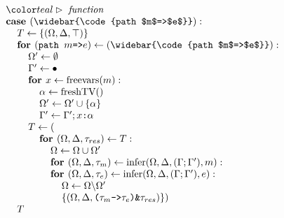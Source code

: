 \documentclass[acmsmall]{acmart}
\begin{document}
\begin{figure*}[h]
\[\begin{array}[t]{@{} l}
    \\

    \I \C{function}
    \\
    \I \B{case } (\widebar{\code{path $m$=>$e$}})  :  
    \\
    \I\I T \leftarrow \{(\Omega, \Delta, \top)\}
    \\
    \I\I \B{for } (\code{path $m$=>$e$}) \leftarrow (\widebar{\code{path $m$=>$e$}}): 
    \\
    \I\I\I \Omega' \leftarrow \emptyset
    \\
    \I\I\I \Gamma' \leftarrow \bullet
    \\
    \I\I\I \B{for } x \leftarrow \F{freevars}(m):
    \\
    \I\I\I\I \alpha \leftarrow \F{freshTV}() 
    \\
    \I\I\I\I \Omega' \leftarrow \Omega' \cup \{\alpha\} 
    \\
    \I\I\I\I \Gamma' \leftarrow \Gamma';\code{$x$:$\alpha$}
    \\
    \I\I\I T \leftarrow (
    \\
    \I\I\I\I \B{for } (\Omega, \Delta, \tau_{res}) \leftarrow T: 
    \\
    \I\I\I\I\I \Omega \leftarrow \Omega \cup \Omega'
    \\
    \I\I\I\I\I \B{for } (\Omega, \Delta, \tau_{m}) \leftarrow \F{infer}(\Omega, \Delta, (\Gamma;\Gamma'), m): 
    \\
    \I\I\I\I\I \B{for } (\Omega, \Delta, \tau_{e}) \leftarrow \F{infer}(\Omega, \Delta, (\Gamma;\Gamma'), e): 
    \\
    \I\I\I\I\I\I \Omega \leftarrow \Omega \backslash \Omega'
    \\
    \I\I\I\I\I\I \{(\Omega, \Delta, \code{($\tau_{m}$->$\tau_{e}$)\&$\tau_{res}$})\})
    \\
    \I\I T

    \\


\end{array}\]
\end{figure*}
\end{document}
